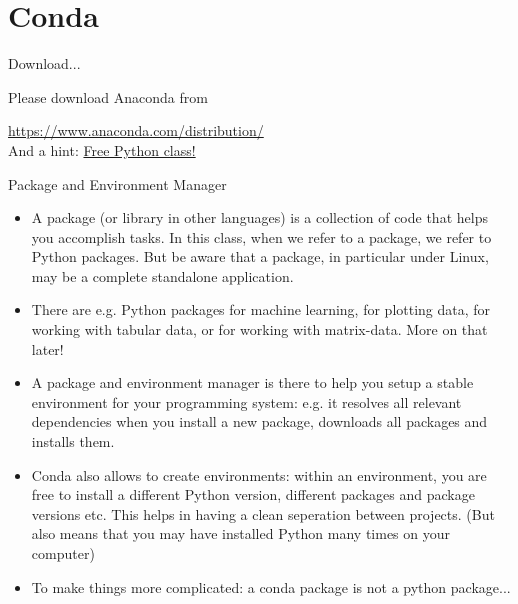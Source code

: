 
\subtitle{Installation of Python in Conda and first steps in Python}
\date{2020-03-26}


\begin{frame}
	\tableofcontents
\end{frame}

\section{Conda}


\begin{frame}{Download...}
	
	Please download Anaconda from
	
	\href{https://www.anaconda.com/distribution/}{https://www.anaconda.com/distribution/}\\
	
	And a hint:
	\href{https://www.preisjaeger.at/deals/gratis-it-workshops-e-books-von-packtpubcom-227041}{Free Python class!}
	
	
\end{frame}

\begin{frame}{Package and Environment Manager}
	\begin{itemize}
		
		\item A package (or library in other languages) is a collection of code that helps you accomplish tasks. In this class, when we refer to a package, we refer to Python packages. But be aware that a package, in particular under Linux, may be a complete standalone application.
		\item There are e.g. Python packages for machine learning, for plotting data, for working with tabular data, or for working with matrix-data. More on that later! 
		\item A package and environment  manager is there to help you setup a stable environment for your programming system: e.g. it resolves all relevant dependencies when you install a new package, downloads all packages and installs them.
		\item Conda also allows to create environments: within an environment, you are free to install a different Python version, different packages and package versions etc. This helps in having a clean seperation between projects. (But also means that you may have installed Python many times on your computer)
		\item To make things more complicated: a conda package is not a python package...
	\end{itemize}
	
\end{frame}


